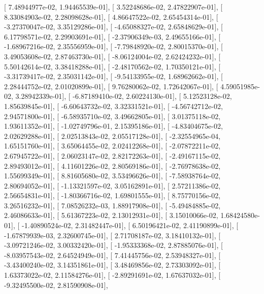 \documentclass{article}
\begin{document}
       [  7.48944977e-02,   1.94465539e-01],
       [  3.52248686e-02,   2.47822907e-01],
       [  8.33084903e-02,   2.28098628e-01],
       [  4.86647522e-02,   2.65454314e-01],
       [ -3.27370047e-02,   3.35129286e-01],
       [ -4.65088327e-02,   2.65848629e-01],
       [  6.17798571e-02,   2.29903691e-01],
       [ -2.37906349e-03,   2.49655166e-01],
       [ -1.68967216e-02,   2.35556959e-01],
       [ -7.79848920e-02,   2.80015370e-01],
       [  3.49053608e-02,   2.87463730e-01],
       [ -8.06124004e-02,   2.62424232e-01],
       [  5.50142614e-02,   3.38418288e-01],
       [ -2.48170562e-02,   1.70350121e-01],
       [ -3.31739417e-02,   2.35031142e-01],
       [ -9.54133955e-02,   1.68962662e-01],
       [  2.28444752e-02,   2.01020899e-01],
       [  9.76280062e-02,   1.72642067e-01],
       [  4.59051985e-02,   3.28942339e-01],
       [ -6.87189410e-02,   2.60224130e-01],
       [  5.12523128e-02,   1.85639845e-01],
       [ -6.60643732e-02,   3.32331521e-01],
       [ -4.56742712e-02,   2.94571800e-01],
       [ -6.58935710e-02,   3.49662805e-01],
       [  3.01375118e-02,   1.93611352e-01],
       [ -1.02749796e-01,   2.15395186e-01],
       [ -4.83404675e-02,   2.02629288e-01],
       [  2.02513843e-02,   2.05517128e-01],
       [ -2.32554965e-04,   1.65151760e-01],
       [  3.65064455e-02,   2.02412268e-01],
       [ -2.07872211e-02,   2.67945722e-01],
       [  2.06023147e-02,   2.82172263e-01],
       [ -2.49167115e-02,   2.89493012e-01],
       [  4.11601226e-02,   2.80569186e-01],
       [ -2.76978638e-02,   1.55699349e-01],
       [  8.81605680e-02,   3.53496626e-01],
       [ -7.58938764e-02,   2.80694052e-01],
       [ -1.13321597e-02,   3.05162891e-01],
       [  2.57211386e-02,   2.56654831e-01],
       [ -1.80366716e-02,   1.69801555e-01],
       [  8.75770156e-02,   3.26516232e-01],
       [  7.08526232e-03,   1.88917908e-01],
       [ -5.49484885e-02,   2.46086633e-01],
       [  5.61367223e-02,   2.13012931e-01],
       [  3.15010066e-02,   1.68424580e-01],
       [ -1.40890524e-02,   2.31482447e-01],
       [  6.50196421e-02,   2.41190899e-01],
       [ -1.67879939e-03,   2.32600745e-01],
       [  2.71708187e-02,   3.18410132e-01],
       [ -3.09721246e-02,   3.00332420e-01],
       [ -1.95333368e-02,   2.87885076e-01],
       [ -8.03957543e-02,   2.64524949e-01],
       [  7.41445756e-02,   2.53948327e-01],
       [ -3.43400240e-02,   3.14351861e-01],
       [  3.48469856e-02,   2.73303092e-01],
       [  1.63373022e-02,   2.11584276e-01],
       [ -2.89291691e-02,   1.67637032e-01],
       [ -9.32495500e-02,   2.81590908e-01],
\end{document}
